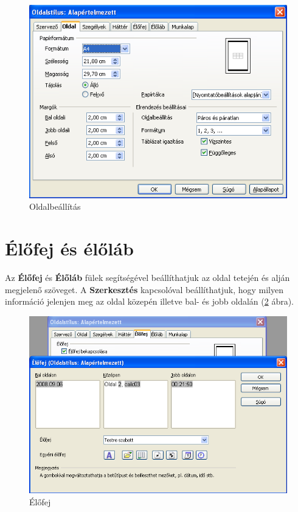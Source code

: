 \begin{figure}[!h]
\begin{center}
\includegraphics[width=12.944cm]{oocalcv2-img165.png}
\caption{Oldalbeállítás}\label{Oldalbeállítás}
\end{center}
\end{figure}


\section{Élőfej és élőláb}

Az \textbf{Élőfej} és \textbf{Élőláb} fülek segítségével
beállíthatjuk az oldal tetején és alján megjelenő
szöveget. A \textbf{Szerkesztés} kapcsolóval beállíthatjuk, hogy
milyen információ jelenjen meg az oldal közepén illetve bal-
és jobb oldalán (\ref{Élőfej} ábra).

\begin{figure}[!h]
\begin{center}
\includegraphics[width=14.999cm]{oocalcv2-img166.png}
\caption{Élőfej}\label{Élőfej}
\end{center}
\end{figure}


